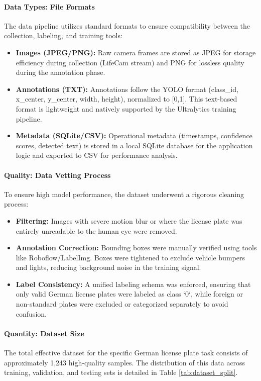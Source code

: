 \paragraph{Data Types: File Formats}
The data pipeline utilizes standard formats to ensure compatibility between the collection, labeling, and training tools:
\begin{itemize}
	\item \textbf{Images (JPEG/PNG):} Raw camera frames are stored as JPEG for storage efficiency during collection (LifeCam stream) and PNG for lossless quality during the annotation phase.
	\item \textbf{Annotations (TXT):} Annotations follow the YOLO format (class\_id, x\_center, y\_center, width, height), normalized to [0,1]. This text-based format is lightweight and natively supported by the Ultralytics training pipeline.
	\item \textbf{Metadata (SQLite/CSV):} Operational metadata (timestamps, confidence scores, detected text) is stored in a local SQLite database for the application logic and exported to CSV for performance analysis.
\end{itemize}

\paragraph{Quality: Data Vetting Process}
To ensure high model performance, the dataset underwent a rigorous cleaning process:
\begin{itemize}
	\item \textbf{Filtering:} Images with severe motion blur or where the license plate was entirely unreadable to the human eye were removed.
	\item \textbf{Annotation Correction:} Bounding boxes were manually verified using tools like Roboflow/LabelImg. Boxes were tightened to exclude vehicle bumpers and lights, reducing background noise in the training signal.
	\item \textbf{Label Consistency:} A unified labeling schema was enforced, ensuring that only valid German license plates were labeled as class `0`, while foreign or non-standard plates were excluded or categorized separately to avoid confusion.
\end{itemize}

\paragraph{Quantity: Dataset Size}
The total effective dataset for the specific German license plate task consists of approximately 1,243 high-quality samples. The distribution of this data across training, validation, and testing sets is detailed in Table \ref{tab:dataset_split}.

